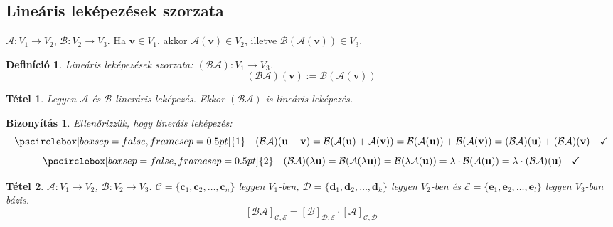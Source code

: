 \documentclass[a4paper,12pt,twoside]{book}
\newcommand{\vek}[1]{\mathbf{#1}} %
\newcommand{\lista}[2]{{#1}_{1}, {#1}_{2}, \ldots, {#1}_{#2}}
\newtheorem{defi}{Definíció}[chapter]
\newtheorem{tetel}{Tétel}[chapter]
\newtheorem{biz}{Bizonyítás}[chapter]
\theoremstyle{break}
\begin{document}
\subsection{Lineáris leképezések szorzata}

$\mathcal{A}: V_1 \to V_2$, $\mathcal{B}: V_2 \to V_3$. Ha $\vek{v}\in V_1$, akkor $\mathcal{A}(\vek{v}) \in V_2$, illetve $\mathcal{B}(\mathcal{A}(\vek{v}))\in V_3$.

\begin{defi} Lineáris leképezések szorzata: $(\mathcal{BA}): V_1 \to V_3$.
\[(\mathcal{BA})(\vek{v}) := \mathcal{B}(\mathcal{A}(\vek{v}))\]
\end{defi}

\begin{tetel}
Legyen $\mathcal{A}$ és $\mathcal{B}$ lineráris leképezés. Ekkor $(\mathcal{BA})$ is lineáris leképezés. 
\end{tetel}
\begin{biz} Ellenőrizzük, hogy lineráis leképezés:
 \[\pscirclebox[boxsep=false,framesep=0.5pt]{1} \quad (\mathcal{BA})(\vek{u}+\vek{v}) = \mathcal{B}(\mathcal{A}(\vek{u})+\mathcal{A}(\vek{v})) = \mathcal{B}(\mathcal{A}(\vek{u})) + \mathcal{B}(\mathcal{A}(\vek{v})) = (\mathcal{BA})(\vek{u}) + (\mathcal{BA})(\vek{v}) \quad \checkmark\]
 \[\pscirclebox[boxsep=false,framesep=0.5pt]{2} \quad (\mathcal{BA})(\lambda\vek{u}) = \mathcal{B}(\mathcal{A}(\lambda\vek{u})) = \mathcal{B}(\lambda\mathcal{A}(\vek{u})) = \lambda\cdot\mathcal{B}(\mathcal{A}(\vek{u})) = \lambda\cdot (\mathcal{BA})(\vek{u}) \quad \checkmark\]
\end{biz}

\begin{tetel} $\mathcal{A}: V_1 \to V_2$, $\mathcal{B}: V_2 \to V_3$. $\mathcal{C}=\{\lista{\vek{c}}{n}\}$ legyen $V_1$-ben, $\mathcal{D}=\{\lista{\vek{d}}{k}\}$ legyen $V_2$-ben és $\mathcal{E}=\{\lista{\vek{e}}{l}\}$ legyen $V_3$-ban bázis.
 \[[\mathcal{BA}]_{\mathcal{C},\mathcal{E}} = [\mathcal{B}]_{\mathcal{D},\mathcal{E}}\cdot[\mathcal{A}]_{\mathcal{C},\mathcal{D}} \]
\end{tetel}
\end{document}
